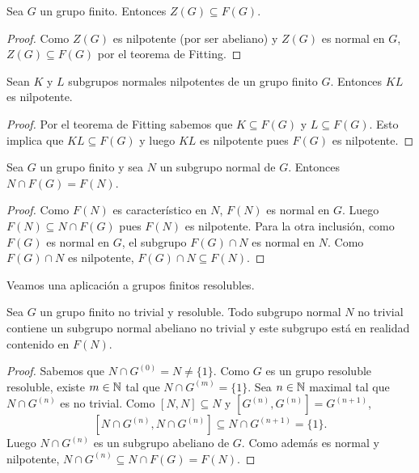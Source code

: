 \begin{corollary}
	\label{corollary:Z(G)subsetF(G)}
	Sea $G$ un grupo finito. Entonces $Z(G)\subseteq F(G)$.
\end{corollary}

\begin{proof}
	Como $Z(G)$ es nilpotente (por ser abeliano) y $Z(G)$ es normal en $G$,
	$Z(G)\subseteq F(G)$ por el teorema de Fitting. 
\end{proof}

\begin{corollary}[Fitting]
	\label{corollary:Fitting}
	Sean $K$ y $L$ subgrupos normales nilpotentes de un grupo finito $G$.
	Entonces $KL$ es nilpotente.
\end{corollary}

\begin{proof}
	Por el teorema de Fitting sabemos que $K\subseteq F(G)$ y
	$L\subseteq F(G)$. Esto implica que $KL\subseteq F(G)$ y luego $KL$ es
	nilpotente pues $F(G)$ es nilpotente.
\end{proof}

\begin{corollary}
	\label{corollary:McapF(G)}
	Sea $G$ un grupo finito y sea $N$ un subgrupo normal de $G$. Entonces
	$N\cap F(G)=F(N)$.
\end{corollary}

\begin{proof}
	Como $F(N)$ es característico en $N$, $F(N)$ es normal en $G$. Luego
	$F(N)\subseteq N\cap F(G)$ pues $F(N)$ es nilpotente. 
	Para la otra inclusión, como
	$F(G)$ es normal en $G$, el subgrupo $F(G)\cap N$ es normal en $N$. Como $F(G)\cap N$
	es nilpotente, $F(G)\cap N\subseteq F(N)$. 
\end{proof}

Veamos una aplicación a grupos finitos resolubles. 

\begin{theorem}
	Sea $G$ un grupo finito no trivial y resoluble. Todo subgrupo normal $N$ no
	trivial contiene un subgrupo normal abeliano no trivial y este subgrupo está en realidad 
	contenido en $F(N)$. 
\end{theorem}

\begin{proof}
	Sabemos que $N\cap G^{(0)}=N\ne\{1\}$. Como $G$ es un grupo resoluble resoluble, 
	existe $m\in\mathbb{N}$ tal que $N\cap
	G^{(m)}=\{1\}$. Sea $n\in\mathbb{N}$ maximal tal que $N\cap G^{(n)}$ es no trivial. 
	Como $[N,N]\subseteq N$ y $[G^{(n)},G^{(n)}]=G^{(n+1)}$, 
	\[
	[N\cap G^{(n)},N\cap G^{(n)}]\subseteq N\cap G^{(n+1)}=\{1\}.
	\]
	Luego $N\cap G^{(n)}$ es un subgrupo abeliano de $G$. Como además es normal
	y nilpotente, $N\cap G^{(n)}\subseteq N\cap F(G)=F(N)$.
\end{proof}


